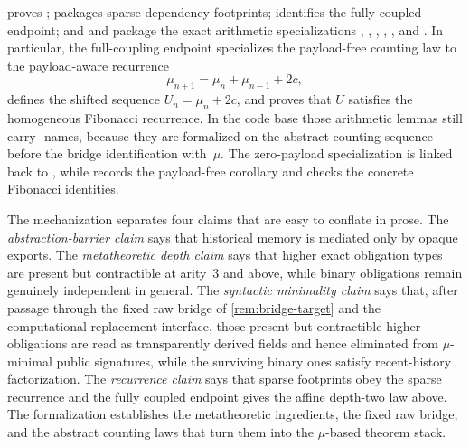 \documentclass{lmcs}
\begin{document}
 proves ;  packages sparse dependency footprints;  identifies the fully coupled endpoint; and  and  package the exact arithmetic specializations , , , , , and . In particular, the full-coupling endpoint specializes the payload-free counting law to the payload-aware recurrence
\[
  \mu_{n+1} = \mu_n + \mu_{n-1} + 2c,
\]
defines the shifted sequence $U_n=\mu_n+2c$, and proves that $U$ satisfies the homogeneous Fibonacci recurrence. In the code base those arithmetic lemmas still carry -names, because they are formalized on the abstract counting sequence before the bridge identification with~$\mu$. The zero-payload specialization is linked back to , while  records the payload-free corollary and  checks the concrete Fibonacci identities.

The mechanization separates four claims that are easy to conflate in prose. The \emph{abstraction-barrier claim} says that historical memory is mediated only by opaque exports. The \emph{metatheoretic depth claim} says that higher exact obligation types are present but contractible at arity~$3$ and above, while binary obligations remain genuinely independent in general. The \emph{syntactic minimality claim} says that, after passage through the fixed raw bridge of \autoref{rem:bridge-target} and the computational-replacement interface, those present-but-contractible higher obligations are read as transparently derived fields and hence eliminated from $\mu$-minimal public signatures, while the surviving binary ones satisfy recent-history factorization. The \emph{recurrence claim} says that sparse footprints obey the sparse recurrence and the fully coupled endpoint gives the affine depth-two law above. The formalization establishes the metatheoretic ingredients, the fixed raw bridge, and the abstract counting laws that turn them into the $\mu$-based theorem stack.
\end{document}
